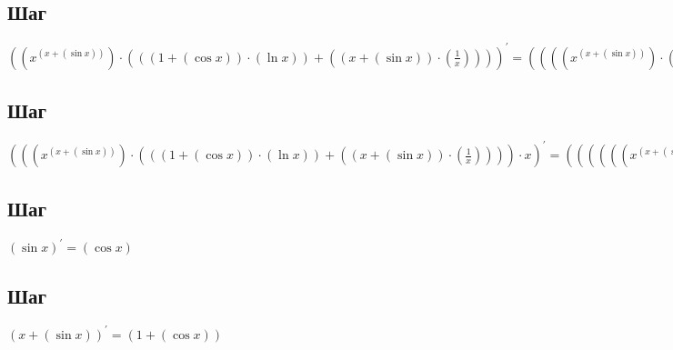 \documentclass[12pt, letterpaper]{report}
\begin{document}
\subsection{Шаг}
\begin{center} $({({x}^{({x}+{(\sin{x})})})}\cdot{({({({1}+{(\cos{x})})}\cdot{(\ln{x})})}+{({({x}+{(\sin{x})})}\cdot{(\frac{1}{x})})})})^{\prime} = ({({({({x}^{({x}+{(\sin{x})})})}\cdot{({({({1}+{(\cos{x})})}\cdot{(\ln{x})})}+{({({x}+{(\sin{x})})}\cdot{(\frac{1}{x})})})})}\cdot{({({({1}+{(\cos{x})})}\cdot{(\ln{x})})}+{({({x}+{(\sin{x})})}\cdot{(\frac{1}{x})})})})}+{({({x}^{({x}+{(\sin{x})})})}\cdot{({({({({-1}\cdot{(\sin{x})})}\cdot{(\ln{x})})}+{({({1}+{(\cos{x})})}\cdot{(\frac{1}{x})})})}+{({({({1}+{(\cos{x})})}\cdot{(\frac{1}{x})})}+{({({x}+{(\sin{x})})}\cdot{(\frac{-1}{({x}^{2})})})})})})})$ \end{center} 

\subsection{Шаг}
\begin{center} $({({({x}^{({x}+{(\sin{x})})})}\cdot{({({({1}+{(\cos{x})})}\cdot{(\ln{x})})}+{({({x}+{(\sin{x})})}\cdot{(\frac{1}{x})})})})}\cdot{x})^{\prime} = ({({({({({({x}^{({x}+{(\sin{x})})})}\cdot{({({({1}+{(\cos{x})})}\cdot{(\ln{x})})}+{({({x}+{(\sin{x})})}\cdot{(\frac{1}{x})})})})}\cdot{({({({1}+{(\cos{x})})}\cdot{(\ln{x})})}+{({({x}+{(\sin{x})})}\cdot{(\frac{1}{x})})})})}+{({({x}^{({x}+{(\sin{x})})})}\cdot{({({({({-1}\cdot{(\sin{x})})}\cdot{(\ln{x})})}+{({({1}+{(\cos{x})})}\cdot{(\frac{1}{x})})})}+{({({({1}+{(\cos{x})})}\cdot{(\frac{1}{x})})}+{({({x}+{(\sin{x})})}\cdot{(\frac{-1}{({x}^{2})})})})})})})}\cdot{x})}+{({({x}^{({x}+{(\sin{x})})})}\cdot{({({({1}+{(\cos{x})})}\cdot{(\ln{x})})}+{({({x}+{(\sin{x})})}\cdot{(\frac{1}{x})})})})})$ \end{center} 

\subsection{Шаг}
\begin{center} $(\sin{x})^{\prime} = (\cos{x})$ \end{center} 

\subsection{Шаг}
\begin{center} $({x}+{(\sin{x})})^{\prime} = ({1}+{(\cos{x})})$ \end{center} 
\end{document}
